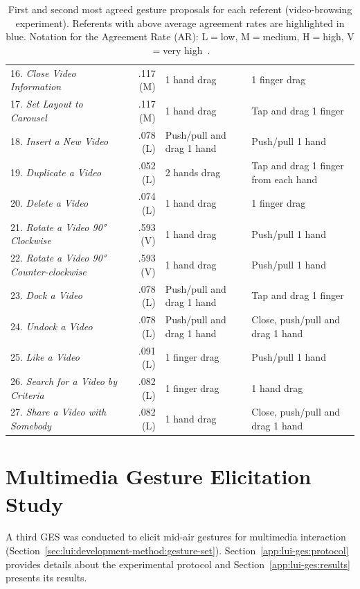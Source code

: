 \begin{table}[ht]
{\begin{tabular}{lrll}
        16. \textit{Close Video Information} & .117 (M) & 1 hand drag & 1 finger drag\\
        17. \textit{Set Layout to Carousel} & .117 (M) & 1 hand drag & Tap and drag 1 finger\\
        18. \textit{Insert a New Video} & .078 (L) & Push/pull and drag 1 hand & Push/pull 1 hand\\
        19. \textit{Duplicate a Video} & .052 (L) & 2 hands drag & Tap and drag 1 finger from each hand\\
        20. \textit{Delete a Video} & .074 (L) & 1 hand drag & 1 finger drag\\
        21. \textit{Rotate a Video 90° Clockwise} & \cellcolor{graybluebrighter} .593 (V) & 1 hand drag & Push/pull 1 hand\\
        22. \textit{Rotate a Video 90° Counter-clockwise} & \cellcolor{graybluebrighter} .593 (V) & 1 hand drag & Push/pull 1 hand\\
        23. \textit{Dock a Video} & .078 (L) & Push/pull and drag 1 hand & Tap and drag 1 finger\\
        24. \textit{Undock a Video} & .078 (L) & Push/pull and drag 1 hand & Close, push/pull and drag 1 hand\\
        25. \textit{Like a Video} & .091 (L) & 1 finger drag & Push/pull 1 hand\\
        26. \textit{Search for a Video by Criteria} & .082 (L) & 1 finger drag & 1 hand drag\\
        27. \textit{Share a Video with Somebody} & .082 (L) & 1 hand drag & Close, push/pull and drag 1 hand\\
		\bottomrule
	\end{tabular}
	}
	\caption{First and second most agreed gesture proposals for each referent (video-browsing experiment). Referents with above average agreement rates are highlighted in blue. Notation for the Agreement Rate (AR): L${=}$low, M${=}$medium, H${=}$high, V${=}$very high~\cite{Vatavu:2015}.}
	\label{tbl:lui-ges:agreement-video}
	\vspace{-10pt}
\end{table}


\section{Multimedia Gesture Elicitation Study} \label{app:lui-ges:new}
A third GES was conducted to elicit mid-air gestures for multimedia interaction (Section~\ref{sec:lui:development-method:gesture-set}). Section~\ref{app:lui-ges:protocol} provides details about the experimental protocol and Section~\ref{app:lui-ges:results} presents its results.

